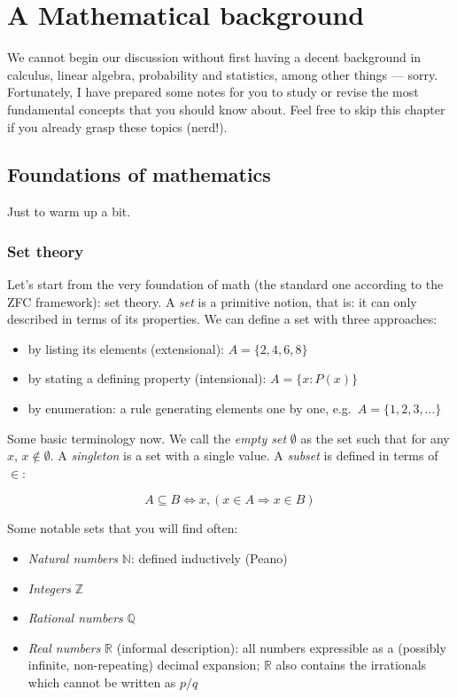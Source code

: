 \documentclass{article}
\begin{document}
\newpage


\section{A Mathematical background}\label{a-mathematical-background}

We cannot begin our discussion without first having a decent background
in calculus, linear algebra, probability and statistics, among other
things --- sorry. Fortunately, I have prepared some notes for you to
study or revise the most fundamental concepts that you should know
about. Feel free to skip this chapter if you already grasp these topics
(nerd!).

\subsection{Foundations of
mathematics}\label{foundations-of-mathematics}

Just to warm up a bit.

\subsubsection{Set theory}\label{set-theory}

Let's start from the very foundation of math (the standard one according
to the ZFC framework): set theory. A \emph{set} is a primitive notion,
that is: it can only described in terms of its properties. We can define
a set with three approaches:

\begin{itemize}
\tightlist
\item
  by listing its elements (extensional): \(A = \{2, 4, 6, 8\}\)
\item
  by stating a defining property (intensional): \(A = \{x : P(x)\}\)
\item
  by enumeration: a rule generating elements one by one,
  e.g.~\(A=\{1, 2, 3,
  ...\}\)
\end{itemize}

Some basic terminology now. We call the \emph{empty set} \(\emptyset\)
as the set such that for any \(x\), \(x \notin \emptyset\). A
\emph{singleton} is a set with a single value. A \emph{subset} is
defined in terms of \(\in\):

\[A \subseteq B \iff  x, (x \in A \Rightarrow x \in B) \]

Some notable sets that you will find often:

\begin{itemize}
\item
  \emph{Natural numbers} \(\mathbb{N}\): defined inductively (Peano)
\item
  \emph{Integers} \(\mathbb{Z}\)
\item
  \emph{Rational numbers} \(\mathbb{Q}\)
\item
  \emph{Real numbers} \(\mathbb{R}\) (informal description): all numbers
  expressible as a (possibly infinite, non-repeating) decimal expansion;
  \(\mathbb{R}\) also contains the irrationals which cannot be written
  as \(p/q\)
\end{itemize}
\end{document}
